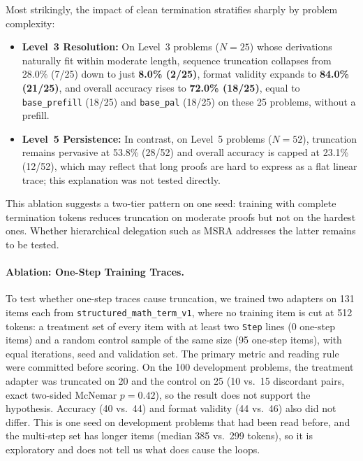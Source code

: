 \documentclass[11pt,a4paper]{article}
\begin{document}
Most strikingly, the impact of clean termination stratifies sharply by problem complexity:
\begin{itemize}
    \item \textbf{Level~3 Resolution:} On Level~3 problems ($N=25$) whose derivations naturally fit within moderate length, sequence truncation collapses from 28.0\% (7/25) down to just \textbf{8.0\% (2/25)}, format validity expands to \textbf{84.0\% (21/25)}, and overall accuracy rises to \textbf{72.0\% (18/25)}, equal to \texttt{base\_prefill} (18/25) and \texttt{base\_pal} (18/25) on these 25 problems, without a prefill.
    \item \textbf{Level~5 Persistence:} In contrast, on Level~5 problems ($N=52$), truncation remains pervasive at 53.8\% (28/52) and overall accuracy is capped at 23.1\% (12/52), which may reflect that long proofs are hard to express as a flat linear trace; this explanation was not tested directly.
\end{itemize}
This ablation suggests a two-tier pattern on one seed: training with complete termination tokens reduces truncation on moderate proofs but not on the hardest ones. Whether hierarchical delegation such as MSRA addresses the latter remains to be tested.

\paragraph{Ablation: One-Step Training Traces.}
\label{sec:onestep_ablation}
To test whether one-step traces cause truncation, we trained two adapters on 131 items each from \texttt{structured\_math\_term\_v1}, where no training item is cut at 512 tokens: a treatment set of every item with at least two \texttt{Step} lines (0 one-step items) and a random control sample of the same size (95 one-step items), with equal iterations, seed and validation set. The primary metric and reading rule were committed before scoring. On the 100 development problems, the treatment adapter was truncated on 20 and the control on 25 (10 vs.\ 15 discordant pairs, exact two-sided McNemar $p = 0.42$), so the result does not support the hypothesis. Accuracy (40 vs.\ 44) and format validity (44 vs.\ 46) also did not differ. This is one seed on development problems that had been read before, and the multi-step set has longer items (median 385 vs.\ 299 tokens), so it is exploratory and does not tell us what does cause the loops.
\end{document}
